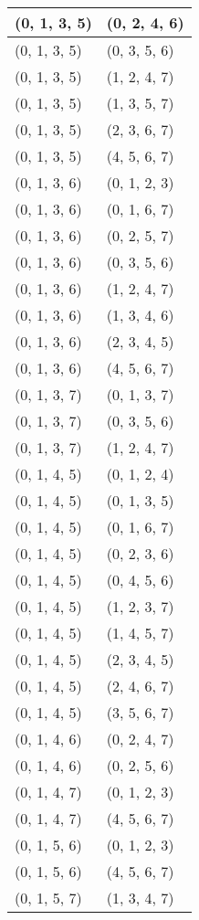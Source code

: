 \begin{footnotesize}
\begin{longtable}[c]{|l|l|}
(0, 1, 3, 5)
&(0, 2, 4, 6)
\\ \hline
(0, 1, 3, 5)
&(0, 3, 5, 6)
\\ \hline
(0, 1, 3, 5)
&(1, 2, 4, 7)
\\ \hline
(0, 1, 3, 5)
&(1, 3, 5, 7)
\\ \hline
(0, 1, 3, 5)
&(2, 3, 6, 7)
\\ \hline
(0, 1, 3, 5)
&(4, 5, 6, 7)
\\ \hline
(0, 1, 3, 6)
&(0, 1, 2, 3)
\\ \hline
(0, 1, 3, 6)
&(0, 1, 6, 7)
\\ \hline
(0, 1, 3, 6)
&(0, 2, 5, 7)
\\ \hline
(0, 1, 3, 6)
&(0, 3, 5, 6)
\\ \hline
(0, 1, 3, 6)
&(1, 2, 4, 7)
\\ \hline
(0, 1, 3, 6)
&(1, 3, 4, 6)
\\ \hline
(0, 1, 3, 6)
&(2, 3, 4, 5)
\\ \hline
(0, 1, 3, 6)
&(4, 5, 6, 7)
\\ \hline
(0, 1, 3, 7)
&(0, 1, 3, 7)
\\ \hline
(0, 1, 3, 7)
&(0, 3, 5, 6)
\\ \hline
(0, 1, 3, 7)
&(1, 2, 4, 7)
\\ \hline
(0, 1, 4, 5)
&(0, 1, 2, 4)
\\ \hline
(0, 1, 4, 5)
&(0, 1, 3, 5)
\\ \hline
(0, 1, 4, 5)
&(0, 1, 6, 7)
\\ \hline
(0, 1, 4, 5)
&(0, 2, 3, 6)
\\ \hline
(0, 1, 4, 5)
&(0, 4, 5, 6)
\\ \hline
(0, 1, 4, 5)
&(1, 2, 3, 7)
\\ \hline
(0, 1, 4, 5)
&(1, 4, 5, 7)
\\ \hline
(0, 1, 4, 5)
&(2, 3, 4, 5)
\\ \hline
(0, 1, 4, 5)
&(2, 4, 6, 7)
\\ \hline
(0, 1, 4, 5)
&(3, 5, 6, 7)
\\ \hline
(0, 1, 4, 6)
&(0, 2, 4, 7)
\\ \hline
(0, 1, 4, 6)
&(0, 2, 5, 6)
\\ \hline
(0, 1, 4, 7)
&(0, 1, 2, 3)
\\ \hline
(0, 1, 4, 7)
&(4, 5, 6, 7)
\\ \hline
(0, 1, 5, 6)
&(0, 1, 2, 3)
\\ \hline
(0, 1, 5, 6)
&(4, 5, 6, 7)
\\ \hline
(0, 1, 5, 7)
&(1, 3, 4, 7)
\\ \hline

\end{longtable}
\end{footnotesize}
